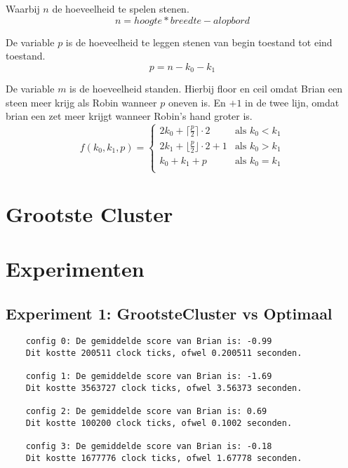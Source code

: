 \documentclass[10pt]{article}
\begin{document}
Waarbij $n$ de hoeveelheid te spelen stenen.
\begin{equation}
    n = hoogte * breedte - alopbord
\end{equation}

De variable $p$ is de hoeveelheid te leggen stenen van begin toestand tot eind toestand.
\begin{equation}
    p = n - k_0 - k_1
\end{equation}

De variable $m$ is de hoeveelheid standen. Hierbij floor en ceil omdat Brian een steen meer krijg als Robin wanneer $p$ oneven is. En $+1$ in de twee lijn, omdat brian een zet meer krijgt wanneer Robin's hand groter is.
\begin{equation}
    f(k_0, k_1, p) = \begin{cases} 
    2k_0 + \lceil \frac{p}{2} \rceil \cdot 2 & \text{als } k_0 < k_1 \\
    2k_1 + \lfloor \frac{p}{2} \rfloor \cdot 2 + 1 & \text{als } k_0 > k_1 \\
    k_0 + k_1 + p & \text{als } k_0 = k_1 \\ 
\end{cases}
\end{equation}


\section{Grootste Cluster}

\section{Experimenten}
\subsection{Experiment 1: GrootsteCluster vs Optimaal}
\begin{verbatim}
    config 0: De gemiddelde score van Brian is: -0.99
    Dit kostte 200511 clock ticks, ofwel 0.200511 seconden.
    
    config 1: De gemiddelde score van Brian is: -1.69
    Dit kostte 3563727 clock ticks, ofwel 3.56373 seconden.
    
    config 2: De gemiddelde score van Brian is: 0.69
    Dit kostte 100200 clock ticks, ofwel 0.1002 seconden.
    
    config 3: De gemiddelde score van Brian is: -0.18
    Dit kostte 1677776 clock ticks, ofwel 1.67778 seconden.
\end{verbatim}
\end{document}

